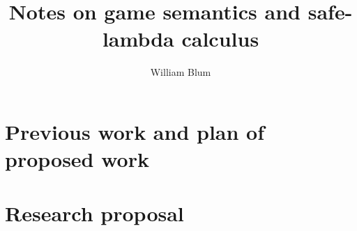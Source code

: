 \documentclass[nocenter,sfbold]{thesis}
\author{William Blum}
\title{Notes on game semantics and safe-lambda calculus}
\begin{document}
\maketitle \tableofcontents

\part{Previous work and plan of proposed work}




\part{Research proposal}













         {\protect{}}
\end{document}

